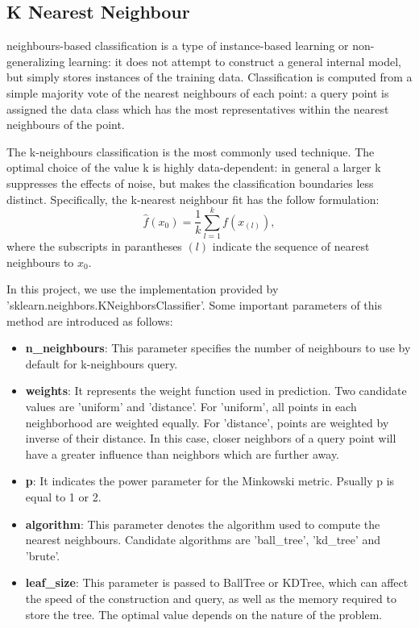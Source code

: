 \documentclass[10pt,journal,compsoc]{IEEEtran}
\begin{document}
\subsection{K Nearest Neighbour}
\label{subsec:k_nearest_neighbour}
neighbours-based classification is a type of instance-based learning or non-generalizing learning: it does not attempt to construct a general internal model, but simply stores instances of the training data. Classification is computed from a simple majority vote of the nearest neighbours of each point: a query point is assigned the data class which has the most representatives within the nearest neighbours of the point.

The k-neighbours classification is the most commonly used technique. The optimal choice of the value k is highly data-dependent: in general a larger k  suppresses the effects of noise, but makes the classification boundaries less distinct. Specifically, the k-nearest neighbour fit has the follow formulation:
\begin{equation}
  \hat{f}(x_0) = \frac{1}{k}\sum_{l=1}^k f(x_{(l)}),
\end{equation}
where the subscripts in parantheses $(l)$ indicate the sequence of nearest neighbours to $x_0$.

In this project, we use the implementation provided by 'sklearn.neighbors.KNeighborsClassifier'. Some important parameters of this method are introduced as follows:
\begin{itemize}
  \item \textbf{n\_neighbours}: This parameter specifies the number of neighbours to use by default for k-neighbours query.
  \item \textbf{weights}: It represents the weight function used in prediction. Two candidate values are 'uniform' and 'distance'. For 'uniform', all points in each neighborhood are weighted equally. For 'distance', points are weighted by inverse of their distance. In this case, closer neighbors of a query point will have a greater influence than neighbors which are further away.
  \item \textbf{p}: It indicates the power parameter for the Minkowski metric. Psually p is equal to 1 or 2.
  \item \textbf{algorithm}: This parameter denotes the algorithm used to compute the nearest neighbours. Candidate algorithms are 'ball\_tree', 'kd\_tree' and 'brute'.
  \item \textbf{leaf\_size}: This parameter is passed to BallTree or KDTree, which can affect the speed of the construction and query, as well as the memory required to store the tree. The optimal value depends on the nature of the problem.
\end{itemize}
\end{document}
